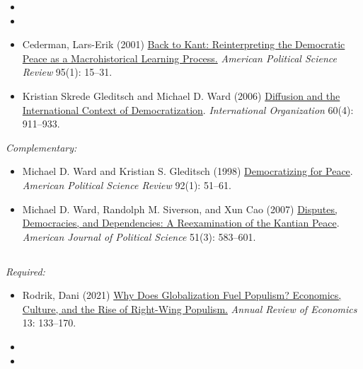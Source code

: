 \documentclass[12pt, a4paper]{article}
\begin{document}
\begin{itemize}
  \item
  \item
  \item Cederman, Lars-Erik (2001) \href{https://doi.org/10.1017/S0003055401000028}{Back to Kant: Reinterpreting the Democratic Peace as a Macrohistorical Learning Process.} \textit{American Political Science Review} 95(1): 15--31.
  \item Kristian Skrede Gleditsch and Michael D. Ward (2006) \href{https://doi.org/10.1017/S0020818306060309}{Diffusion and the International Context of Democratization}. \textit{International Organization} 60(4): 911--933.
\end{itemize}

\noindent\textit{Complementary:}

\begin{itemize}
  \item Michael D. Ward and Kristian S. Gleditsch (1998) \href{https://doi.org/10.2307/2585928}{Democratizing for Peace}. \textit{American Political Science Review} 92(1): 51--61.
  \item Michael D. Ward, Randolph M. Siverson, and Xun Cao (2007) \href{https://doi.org/10.1111/j.1540-5907.2007.00269.x}{Disputes, Democracies, and Dependencies: A Reexamination of the Kantian Peace}. \textit{American Journal of Political Science} 51(3): 583--601.
\end{itemize}

\vspace{20pt}
\hline
\subsection*{{\color{red}{Session 5: Political economy}}}

\noindent\textit{Required:}

\begin{itemize}
  \item Rodrik, Dani (2021) \href{https://www.annualreviews.org/doi/abs/10.1146/annurev-economics-070220-032416}{Why Does Globalization Fuel Populism? Economics, Culture, and the Rise of Right-Wing Populism.} \textit{Annual Review of Economics} 13: 133--170.
  \item
  \item
\end{itemize}

\end{document}
